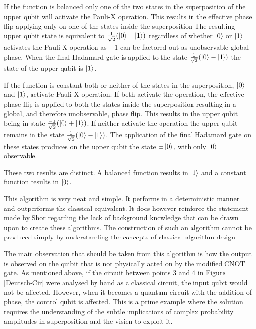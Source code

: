 If the function is balanced only one of the two states in the superposition of the upper qubit will activate the Pauli-X operation.
This results in the effective phase flip applying only on one of the states inside the superposition
The resulting upper qubit state is equivalent to $\frac{1}{\sqrt{2}}(\left\vert{0}\right\rangle-\left\vert{1}\right\rangle)$ regardless of whether $\left\vert{0}\right\rangle$ or $\left\vert{1}\right\rangle$ activates the Pauli-X operation as $-1$ can be factored out as unobservable global phase.
When the final Hadamard gate is applied to the state $\frac{1}{\sqrt{2}}(\left\vert{0}\right\rangle-\left\vert{1}\right\rangle)$ the state of the upper qubit is $\left\vert{1}\right\rangle$.

If the function is constant both or neither of the states in the superposition, $\left\vert{0}\right\rangle$ and $\left\vert{1}\right\rangle$, activate Pauli-X operation.
If both activate the operation, the effective phase flip is applied to both the states inside the superposition resulting in a global, and therefore unobservable, phase flip.
This results in the upper qubit being in state $\frac{-1}{\sqrt{2}}(\left\vert{0}\right\rangle+\left\vert{1}\right\rangle)$.
If neither activate the operation the upper qubit remains in the state $\frac{1}{\sqrt{2}}(\left\vert{0}\right\rangle-\left\vert{1}\right\rangle)$.
The application of the final Hadamard gate on these states produces on the upper qubit the state $\pm\left\vert{0}\right\rangle$, with only $\left\vert{0}\right\rangle$ observable.

These two results are distinct.
A balanced function results in $\left\vert{1}\right\rangle$ and a constant function results in $\left\vert{0}\right\rangle$.

This algorithm is very neat and simple.
It performs in a deterministic manner and outperforms the classical equivalent.
It does however reinforce the statement made by Shor\cite{Shor:2004:PQA:1032132.1032149} regarding the lack of background knowledge that can be drawn upon to create these algorithms.
The construction of such an algorithm cannot be produced simply by understanding the concepts of classical algorithm design.

The main observation that should be taken from this algorithm is how the output is observed on the quibit that is not physically acted on by the modified CNOT gate.
As mentioned above, if the circuit between points $3$ and $4$ in Figure \ref{Deutsch-Cir} were analysed by hand as a classical circuit, the input qubit would not be affected.
However, when it becomes a quantum circuit with the addition of phase, the control qubit is affected.
This is a prime example where the solution requires the understanding of the subtle implications of complex probability amplitudes in superposition and the vision to exploit it.

